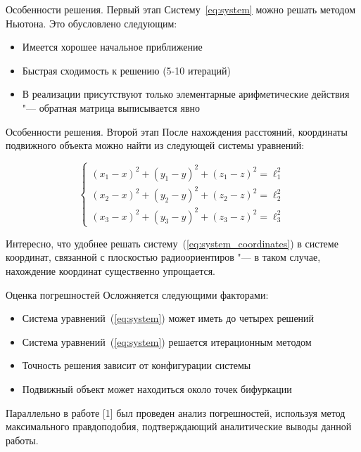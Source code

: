 \documentclass[russian,hyperref={unicode}]{beamer}
\begin{document}
  \begin{frame}{Особенности решения. Первый этап}
    Систему~\ref{eq:system} можно решать методом Ньютона. Это обусловлено следующим:
    \begin{itemize}
      \item Имеется хорошее начальное приближение
      \item Быстрая сходимость к решению (5-10 итераций)
      \item В реализации присутствуют только элементарные арифметические действия "--- обратная
            матрица выписывается явно
    \end{itemize}
  \end{frame}

  \begin{frame}{Особенности решения. Второй этап}
    После нахождения расстояний, координаты подвижного объекта можно найти из следующей
    системы уравнений:

    \begin{equation}\label{eq:system_coordinates}
      \begin{cases}
        \left(x_1 - x\right)^2 + \left(y_1 - y\right)^2 + \left(z_1 - z\right)^2 = \ell_1^2 \\
        \left(x_2 - x\right)^2 + \left(y_2 - y\right)^2 + \left(z_2 - z\right)^2 = \ell_2^2 \\
        \left(x_3 - x\right)^2 + \left(y_3 - y\right)^2 + \left(z_3 - z\right)^2 = \ell_3^2
      \end{cases}
    \end{equation}

    Интересно, что удобнее решать систему~(\ref{eq:system_coordinates}) в системе координат,
    связанной с плоскостью радиоориентиров "--- в таком случае, нахождение координат
    существенно упрощается.
  \end{frame}

  \begin{frame}{Оценка погрешностей}
    Осложняется следующими факторами:
    \begin{itemize}
      \item Система уравнений~(\ref{eq:system}) может иметь до четырех решений
      \item Система уравнений~(\ref{eq:system}) решается итерационным методом
      \item Точность решения зависит от конфигурации системы
      \item Подвижный объект может находиться около точек бифуркации
    \end{itemize}

    Параллельно в работе [1] был проведен анализ погрешностей, используя метод
    максимального правдоподобия, подтверждающий аналитические выводы данной работы.
  \end{frame}
\end{document}
